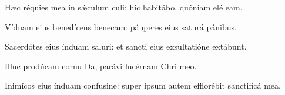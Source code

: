 \item Hæc réquies mea in sǽculum culi:\psstar{} hic habitábo, quóniam elé eam.

\item Víduam eius benedícens benecam:\psstar{} páuperes eius saturá pánibus.

\item Sacerdótes eius índuam saluri:\psstar{} et sancti eius exsultatióne extábunt.

\item Illuc prodúcam cornu Da,\psstar{} parávi lucérnam Chri meo.

\item Inimícos eius índuam confusine:\psstar{} super ipsum autem efflorébit sanctificá mea.
